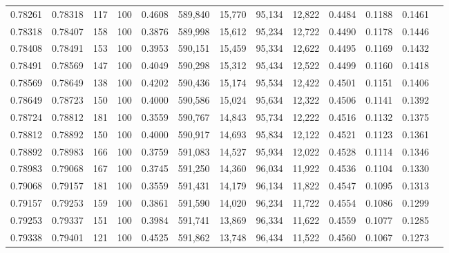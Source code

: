 \begin{tabular}{rrrrrrrrrrrrr}
0.78261 & 0.78318 &   117 & 100 &                                     0.4608 & 589,840 &  15,770 &  95,134 &  12,822 & 0.4484 & 0.1188 & 0.1461 \\
0.78318 & 0.78407 &   158 & 100 &                                     0.3876 & 589,998 &  15,612 &  95,234 &  12,722 & 0.4490 & 0.1178 & 0.1446 \\
0.78408 & 0.78491 &   153 & 100 &                                     0.3953 & 590,151 &  15,459 &  95,334 &  12,622 & 0.4495 & 0.1169 & 0.1432 \\
0.78491 & 0.78569 &   147 & 100 &                                     0.4049 & 590,298 &  15,312 &  95,434 &  12,522 & 0.4499 & 0.1160 & 0.1418 \\
0.78569 & 0.78649 &   138 & 100 &                                     0.4202 & 590,436 &  15,174 &  95,534 &  12,422 & 0.4501 & 0.1151 & 0.1406 \\
0.78649 & 0.78723 &   150 & 100 &                                     0.4000 & 590,586 &  15,024 &  95,634 &  12,322 & 0.4506 & 0.1141 & 0.1392 \\
0.78724 & 0.78812 &   181 & 100 &                                     0.3559 & 590,767 &  14,843 &  95,734 &  12,222 & 0.4516 & 0.1132 & 0.1375 \\
0.78812 & 0.78892 &   150 & 100 &                                     0.4000 & 590,917 &  14,693 &  95,834 &  12,122 & 0.4521 & 0.1123 & 0.1361 \\
0.78892 & 0.78983 &   166 & 100 &                                     0.3759 & 591,083 &  14,527 &  95,934 &  12,022 & 0.4528 & 0.1114 & 0.1346 \\
0.78983 & 0.79068 &   167 & 100 &                                     0.3745 & 591,250 &  14,360 &  96,034 &  11,922 & 0.4536 & 0.1104 & 0.1330 \\
0.79068 & 0.79157 &   181 & 100 &                                     0.3559 & 591,431 &  14,179 &  96,134 &  11,822 & 0.4547 & 0.1095 & 0.1313 \\
0.79157 & 0.79253 &   159 & 100 &                                     0.3861 & 591,590 &  14,020 &  96,234 &  11,722 & 0.4554 & 0.1086 & 0.1299 \\
0.79253 & 0.79337 &   151 & 100 &                                     0.3984 & 591,741 &  13,869 &  96,334 &  11,622 & 0.4559 & 0.1077 & 0.1285 \\
0.79338 & 0.79401 &   121 & 100 &                                     0.4525 & 591,862 &  13,748 &  96,434 &  11,522 & 0.4560 & 0.1067 & 0.1273 \\

\end{tabular}
